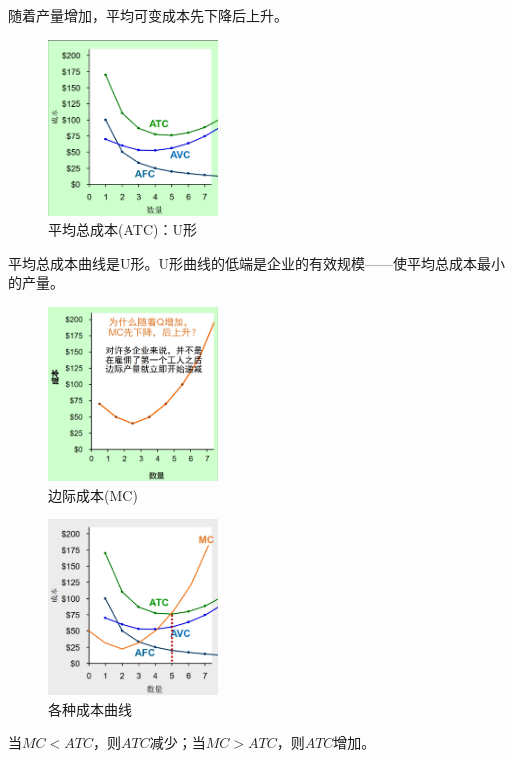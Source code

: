 \documentclass[12pt, a4paper]{article}
\begin{document}
随着产量增加，平均可变成本先下降后上升。

\begin{figure}[H]
  \centering
  \includegraphics[width=0.4\textwidth]{ATC.png}
  \caption{平均总成本(ATC)：U形}
\end{figure}

平均总成本曲线是U形。U形曲线的低端是企业的有效规模——使平均总成本最小的产量。

\begin{figure}[H]
  \centering
  \includegraphics[width=0.4\textwidth]{MC.png}
  \caption{边际成本(MC)}
\end{figure}

\begin{figure}[H]
  \centering
  \includegraphics[width=0.4\textwidth]{各种成本曲线.png}
  \caption{各种成本曲线}
\end{figure}

当\( MC < ATC \)，则\( ATC \)减少；当\( MC > ATC \)，则\( ATC \)增加。
\end{document}
